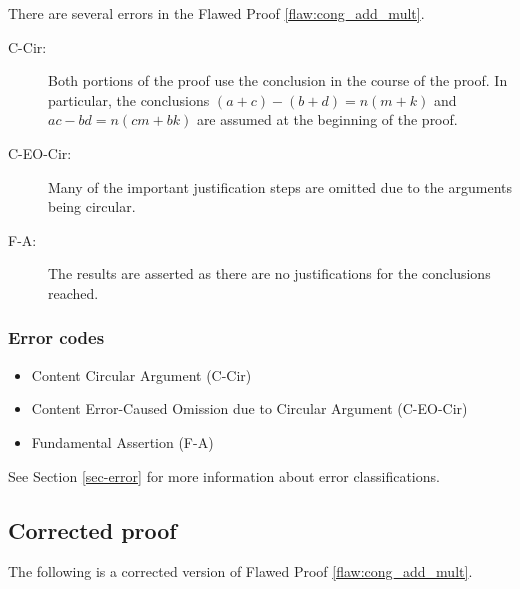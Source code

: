 There are several errors
 in the Flawed Proof \ref{flaw:cong_add_mult}. %

 
 \begin{description}
 	\item[C-Cir:] Both portions of the proof use the conclusion in the course of the proof. In particular, the conclusions $(a+c) - (b+d) = n(m+k)$ and $ac - bd =n(cm + bk)$ are assumed at the beginning of the proof. 
 	\item[C-EO-Cir:] Many of the important justification steps are omitted due to the arguments being circular. 
 	\item[F-A:] The results are asserted as there are no justifications for the conclusions reached. 
 \end{description}

 
\subsubsection{Error codes}
\begin{itemize}
	\item 	Content Circular Argument (C-Cir)
	\item   Content Error-Caused Omission due to Circular Argument (C-EO-Cir)
	\item   Fundamental Assertion (F-A)
\end{itemize}
See Section \ref{sec-error} for more information about error classifications.

\clearpage
\subsection{Corrected proof}

The following is a corrected version of Flawed Proof \ref{flaw:cong_add_mult}. %

